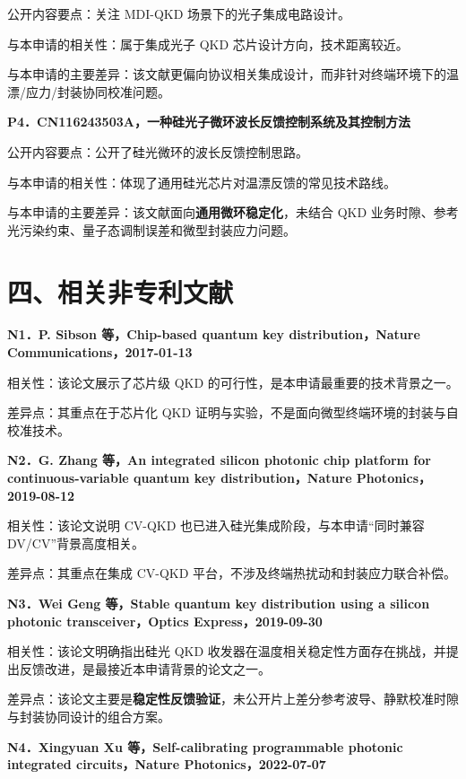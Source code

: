 \documentclass[12pt,a4paper]{article}
\begin{document}
公开内容要点：关注 MDI-QKD 场景下的光子集成电路设计。

与本申请的相关性：属于集成光子 QKD 芯片设计方向，技术距离较近。

与本申请的主要差异：该文献更偏向协议相关集成设计，而非针对终端环境下的温漂/应力/封装协同校准问题。

\vspace{0.5em}
\textbf{P4．CN116243503A，一种硅光子微环波长反馈控制系统及其控制方法}

公开内容要点：公开了硅光微环的波长反馈控制思路。

与本申请的相关性：体现了通用硅光芯片对温漂反馈的常见技术路线。

与本申请的主要差异：该文献面向\textbf{通用微环稳定化}，未结合 QKD 业务时隙、参考光污染约束、量子态调制误差和微型封装应力问题。

\section*{四、相关非专利文献}

\textbf{N1．P. Sibson 等，Chip-based quantum key distribution，Nature Communications，2017-01-13}

相关性：该论文展示了芯片级 QKD 的可行性，是本申请最重要的技术背景之一。

差异点：其重点在于芯片化 QKD 证明与实验，不是面向微型终端环境的封装与自校准技术。

\vspace{0.5em}
\textbf{N2．G. Zhang 等，An integrated silicon photonic chip platform for continuous-variable quantum key distribution，Nature Photonics，2019-08-12}

相关性：该论文说明 CV-QKD 也已进入硅光集成阶段，与本申请“同时兼容 DV/CV”背景高度相关。

差异点：其重点在集成 CV-QKD 平台，不涉及终端热扰动和封装应力联合补偿。

\vspace{0.5em}
\textbf{N3．Wei Geng 等，Stable quantum key distribution using a silicon photonic transceiver，Optics Express，2019-09-30}

相关性：该论文明确指出硅光 QKD 收发器在温度相关稳定性方面存在挑战，并提出反馈改进，是最接近本申请背景的论文之一。

差异点：该论文主要是\textbf{稳定性反馈验证}，未公开片上差分参考波导、静默校准时隙与封装协同设计的组合方案。

\vspace{0.5em}
\textbf{N4．Xingyuan Xu 等，Self-calibrating programmable photonic integrated circuits，Nature Photonics，2022-07-07}
\end{document}
